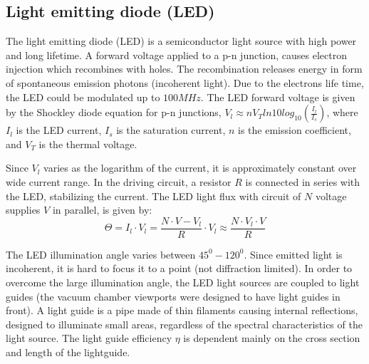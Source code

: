 \documentclass[\main/master.tex]{subfiles}
\begin{document}
\subsection{Light emitting diode (LED)}
The light emitting diode (LED) is a semiconductor light source with high power and long lifetime. A forward voltage applied to a p-n junction, causes electron injection which recombines with holes. The recombination releases energy in form of spontaneous emission photons (incoherent light). Due to the electrons life time, the LED could be modulated up to $100MHz$. The LED forward voltage is given by the Shockley diode equation for p-n junctions, $V_l \approx n V_T ln10 log_{10} (\frac{I_l}{I_s})$, where $I_l$ is the LED current, $I_s$ is the saturation current, $n$ is the emission coefficient, and $V_T$ is the thermal voltage. 
\par\noindent
Since $V_l$ varies as the logarithm of the current, it is approximately constant over wide current range. In the driving circuit, a resistor $R$ is connected in series with the LED, stabilizing the current. The LED light flux with circuit of $N$ voltage supplies $V$ in parallel, is given by:
\begin{equation}
\Theta = I_l\cdot V_l  =\frac{N\cdot V-V_l}{R}\cdot V_l\approx \frac{N\cdot V_l\cdot V}{R}\label{eqn:led power}
\end{equation}
\par\noindent
The LED illumination angle varies between $45^0-120^0$. Since emitted light is incoherent, it is hard to focus it to a point (not diffraction limited). In order to overcome the large illumination angle, the LED light sources are coupled to light guides (the vacuum chamber viewports were designed to have light guides in front). A light guide is a pipe made of thin filaments causing internal reflections, designed to illuminate small areas, regardless of the spectral characteristics of the light source. The light guide efficiency $\eta$ is dependent mainly on the cross section and length of the lightguide. 
\end{document}
